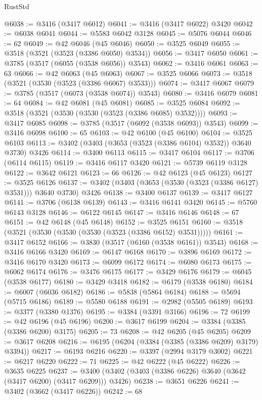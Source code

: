 \begin{lexlean}{RustStd}
\begin{coremodule}
@6038 := @3416 (@3417 @6012)
@6041 := @3416 (@3417 @6022) @3420
@6042 := @6038 @6041
@6044 := @5583 @6042 @3128
@6045 := @5076 @6044
@6046 := 62
@6049 := @42 @6046 (@45 @6046)
@6050 := @3525 @6049
@6055 := @3518 (@3521 (@3523 (@3386 @6050) @3534))
@6056 := @3417 @6050
@6061 := @3785 (@3517 (@6055 (@3538 @6056)) @3543)
@6062 := @3416 @6061
@6063 := 63
@6066 := @42 @6063 (@45 @6063)
@6067 := @3525 @6066
@6073 := @3518 (@3521 (@3530 (@3523 (@3386 @6067) @3533)))
@6074 := @3417 @6067
@6079 := @3785 (@3517 (@6073 (@3538 @6074)) @3543)
@6080 := @3416 @6079
@6081 := 64
@6084 := @42 @6081 (@45 @6081)
@6085 := @3525 @6084
@6092 := @3518 (@3521 (@3530 (@3530 (@3523 (@3386 @6085) @3532))))
@6093 := @3417 @6085
@6098 := @3785 (@3517 (@6092 (@3538 @6093)) @3543)
@6099 := @3416 @6098
@6100 := 65
@6103 := @42 @6100 (@45 @6100)
@6104 := @3525 @6103
@6113 := @3402 (@3403 (@3653 (@3523 (@3386 @6104) @3532)) @3640 @3730) @3426
@6114 := @3400 @6113
@6115 := @3417 @6104
@6117 := @3706 (@6114 @6115)
@6119 := @3416 @6117 @3420
@6121 := @5739 @6119 @3128
@6122 := @3642 @6121
@6123 := 66
@6126 := @42 @6123 (@45 @6123)
@6127 := @3525 @6126
@6137 := @3402 (@3403 (@3653 (@3530 (@3523 (@3386 @6127) @3531))) @3640 @3730) @3426
@6138 := @3400 @6137
@6139 := @3417 @6127
@6141 := @3706 (@6138 @6139)
@6143 := @3416 @6141 @3420
@6145 := @5760 @6143 @3128
@6146 := @6122 @6145
@6147 := @3416 @6146
@6148 := 67
@6151 := @42 @6148 (@45 @6148)
@6152 := @3525 @6151
@6160 := @3518 (@3521 (@3530 (@3530 (@3530 (@3523 (@3386 @6152) @3531)))))
@6161 := @3417 @6152
@6166 := @3830 (@3517 (@6160 (@3538 @6161)) @3543)
@6168 := @3416 @6166 @3420
@6169 := @6147 @6168
@6170 := @3896 @6169
@6172 := @3416 @6170 @3420
@6173 := @6099 @6172
@6174 := @6080 @6173
@6175 := @6062 @6174
@6176 := @3476 @6175
@6177 := @3429 @6176
@6179 := @6045 (@3538 @6177)
@6180 := @3429 @3418
@6182 := @6179 (@3538 @6180)
@6184 := @6007 (@6036 @6182)
@6186 := @5838 (@5864 @6184)
@6188 := @5694 (@5715 @6186)
@6189 := @5580 @6188
@6191 := @2982 (@5505 @6189)
@6193 := @3377 (@3380 @1376)
@6195 := @3384 (@3391 @3166)
@6196 := 72
@6199 := @42 @6196 (@45 @6196)
@6200 := @3617 @6199
@6204 := @3384 (@3385 (@3386 @6200) @3175)
@6205 := 73
@6208 := @42 @6205 (@45 @6205)
@6209 := @3617 @6208
@6216 := @6195 (@6204 (@3384 (@3385 (@3386 @6209) @3179) @3394))
@6217 := @6193 @6216
@6220 := @3397 (@2994 @3179 @3002)
@6221 := @6217 @6220
@6222 := 71
@6225 := @42 @6222 (@45 @6222)
@6226 := @3635 @6225
@6237 := @3400 (@3402 (@3403 (@3386 @6226) @3640 (@3642 (@3417 @6200) (@3417 @6209))) @3426)
@6238 := @3651 @6226
@6241 := @3402 (@3662 (@3417 @6226))
@6242 := 68

\end{coremodule}
\end{lexlean}

